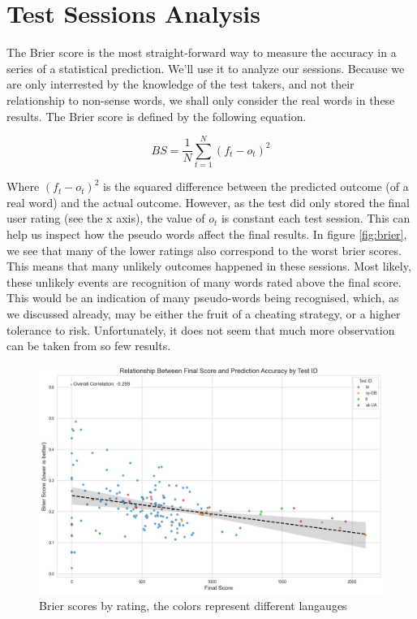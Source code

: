 \section{Test Sessions Analysis}
The Brier score is the most straight-forward way to measure the accuracy in a series of a statistical prediction. We'll use it to analyze our sessions. Because we are only interrested by the knowledge of the test takers, and not their relationship to non-sense words, we shall only consider the real words in these results. The Brier score is defined by the following equation.

\begin{equation}
    BS=\frac{1}{N}\sum^{N}_{t=1} (f_t - o_t)^2
\end{equation}\label{eq:brier-score}

Where $(f_t - o_t)^2$ is the squared difference between the predicted outcome (of a real word) and the actual outcome. However, as the test did only stored the final user rating (see the x axis), the value of $o_t$ is constant each test session. This can help us inspect how the pseudo words affect the final results. In figure \ref{fig:brier}, we see that many of the lower ratings also correspond to the worst brier scores. This means that many unlikely outcomes happened in these sessions. Most likely, these unlikely events are recognition of many words rated above the final score. This would be an indication of many pseudo-words being recognised, which, as we discussed already, may be either the fruit of a cheating strategy, or a higher tolerance to risk.  Unfortunately, it does not seem that much more observation can be taken from so few results.

\begin{figure}
    \centering
    \includegraphics[width=0.8\linewidth]{figures/brier_score.png}
    \caption{Brier scores by rating, the colors represent different langauges}
    \medskip
    \small
    
\end{figure}\label{fig:brier}

